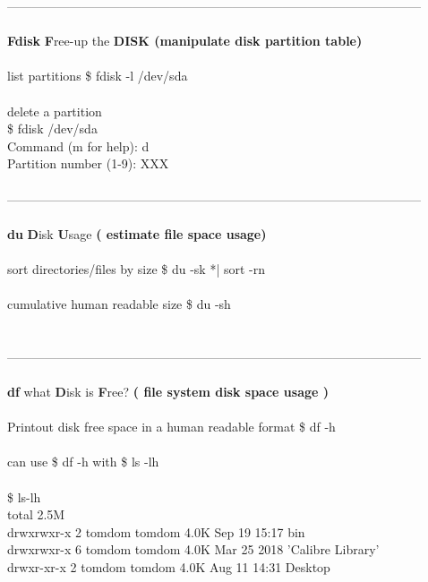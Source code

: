 \documentclass[10pt,a4paper]{article}
\begin{document}
{{{{{{{{{---------------------------------------------------------------------------------------------------\\
\\
\textbf{Fdisk}}{\large \textbf{   F}}{\large ree-up the\textbf{ DISK (manipulate disk partition table)}}{\large \\
\\
list partitions  \$ fdisk -l /dev/sda}{\large \\
\\
delete a partition\\
    \$ fdisk /dev/sda}{\large \\
    Command (m for help): d\\
    Partition number (1-9): XXX\\
\\
---------------------------------------------------------------------------------------------------\\
\\
\textbf{du}}{\large \textbf{   D}}{\large isk\textbf{ U}}{\large sage\textbf{ ( estimate file space usage)}}{\large \\
\\
sort directories/files by size	\$ du -sk *| sort -rn\\
\\
cumulative human readable size	\$ du -sh\\
\\
\\
---------------------------------------------------------------------------------------------------\\
\\
\textbf{df }}{\large \textbf{}}{\large what \textbf{D}}{\large isk is \textbf{F}}{\large ree?\textbf{  ( file system disk space usage )}}{\large \\
\\
Printout disk free space in a human readable format	\$  df -h\\
\\
can use \$ df -h  with \$ ls -lh\\
\\
\$ ls-lh \\
total 2.5M \\
drwxrwxr-x  2 tomdom tomdom 4.0K Sep 19 15:17  bin \\
drwxrwxr-x  6 tomdom tomdom 4.0K Mar 25  2018 'Calibre Library' \\
drwxr-xr-x  2 tomdom tomdom 4.0K Aug 11 14:31  Desktop\\
}}}}}}}}}
\end{document}
